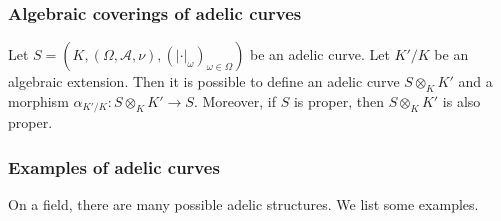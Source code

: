 \documentclass [11pt,reqno]{amsart}
\newcommand{\1}{\mathmybb{1}}
\def\cA{{\mathcal{A}}}
\newcommand{\va}{|\cdot|}
\begin{document}
\subsubsection{Algebraic coverings of adelic curves}

Let $S=(K,(\Omega,\cA,\nu),(\va_{\omega})_{\omega\in \Omega})$ be an adelic curve. Let $K'/K$ be an algebraic extension. Then it is possible to define an adelic curve $S\otimes_K K'$ and a morphism $\alpha_{K'/K} : S\otimes_{K} K' \to S$. Moreover, if $S$ is proper, then $S\otimes_{K}K'$ is also proper. 

\subsubsection{Examples of adelic curves}

On a field, there are many possible adelic structures. We list some examples.
\end{document}
